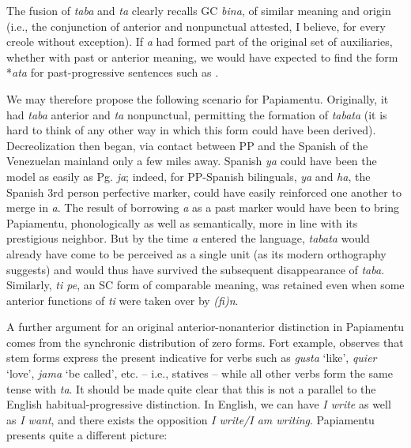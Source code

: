 \label{ex:2:98}\z

The fusion of \textit{taba} and \textit{ta} clearly recalls GC \textit{bina}, of similar meaning and origin (i.e., the conjunction of anterior and nonpunctual attested, I believe, for every creole without exception). If \textit{a} had formed part of the original set of auxiliaries, whether with past or anterior meaning, we would have expected to find the form *\textit{ata} for past-progressive sentences such as .

We may therefore propose the following scenario for Papiamentu. Originally, it had \textit{taba} anterior and \textit{ta} nonpunctual, permitting the formation of \textit{tabata} (it is hard to think of any other way in which this form could have been derived). Decreolization then began, via contact between PP and the Spanish of the Venezuelan mainland only a few miles away. Spanish \textit{ya} could have been the model as easily as Pg. \textit{ja}; indeed, for PP-Spanish bilinguals, \textit{ya} and \textit{ha}, the Spanish 3rd person perfective marker, could have easily reinforced one another to merge in \textit{a}. The result of borrowing \textit{a} as a past marker would have been to bring Papiamentu, phonologically as well as semantically, more in line with its prestigious neighbor. But by the time \textit{a} entered the language, \textit{tabata} would already have come to be perceived as a single unit (as its modern orthography suggests) and would thus have survived the subsequent disappearance of \textit{taba}. Similarly, \textit{ti pe}, an SC form of comparable meaning, was retained even when some anterior functions of \textit{ti} were taken over by \textit{(fi)n}.

A further argument for an original anterior-nonanterior distinc\-tion in Papiamentu comes from the synchronic distribution of zero forms. Fort example, \citet[107]{Goilo1953} observes that stem forms express the present indicative for verbs such as \textit{gusta} `like', \textit{quier} `love', \textit{jama} `be called', etc. -- i.e., statives -- while all other verbs form the same tense with \textit{ta}. It should be made quite clear that this is not a parallel to the English habitual-progressive distinction. In English, we can have \textit{I write} as well as \textit{I want}, and there exists the opposition \textit{I write/I am writing}. Papiamentu presents quite a different picture:

